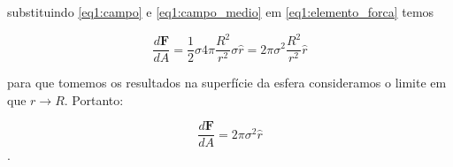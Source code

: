 substituindo \ref{eq1:campo} e \ref{eq1:campo_medio} em \ref{eq1:elemento_forca} temos

\begin{equation}
	\frac{d\textbf{F}}{dA} = \frac{1}{2} \sigma 4\pi \frac{R^2}{r^2} \sigma \hat{r} = 2\pi \sigma^2 \frac{R^2}{r^2} \hat{r}
\end{equation}

para que tomemos os resultados na superfície da esfera consideramos o limite em que $r \rightarrow R$. Portanto:

\begin{equation}
	\frac{d\textbf{F}}{dA} = 2\pi \sigma^2 \hat{r}
\end{equation}.